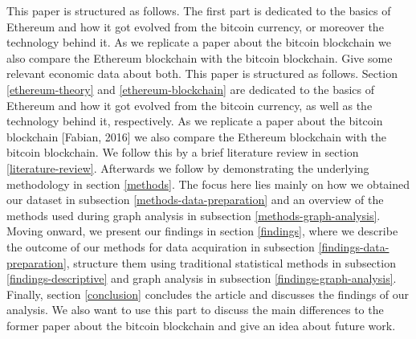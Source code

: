 This paper is structured as follows. The first part is dedicated to the basics of Ethereum and how it got evolved from the bitcoin currency, or moreover the technology behind it. As we replicate a paper about the bitcoin blockchain \cite{lischke2016analyzing} we also compare the Ethereum blockchain with the bitcoin blockchain. Give some relevant economic data about both.
This paper is structured as follows. 
Section \ref{ethereum-theory} and \ref{ethereum-blockchain} are dedicated to the basics of Ethereum and how it got evolved from the bitcoin currency, as well as the technology behind it, respectively. 
As we replicate a paper about the bitcoin blockchain [Fabian, 2016] we also compare the Ethereum blockchain with the bitcoin blockchain. We follow this by a brief literature review in section \ref{literature-review}.
Afterwards we follow by demonstrating the underlying methodology in section \ref{methods}. 
The focus here lies mainly on how we obtained our dataset in subsection \ref{methods-data-preparation} and an overview of the methods used during graph analysis in subsection \ref{methods-graph-analysis}. 
Moving onward, we present our findings in section \ref{findings}, where we describe the outcome of our methods for data acquiration in subsection \ref{findings-data-preparation}, structure them using traditional statistical methods in subsection \ref{findings-descriptive} and graph analysis in subsection \ref{findings-graph-analysis}.
Finally, section \ref{conclusion} concludes the article and discusses the findings of our analysis. 
We also want to use this part to discuss the main differences to the former paper about the bitcoin blockchain and give an idea about future work. 
